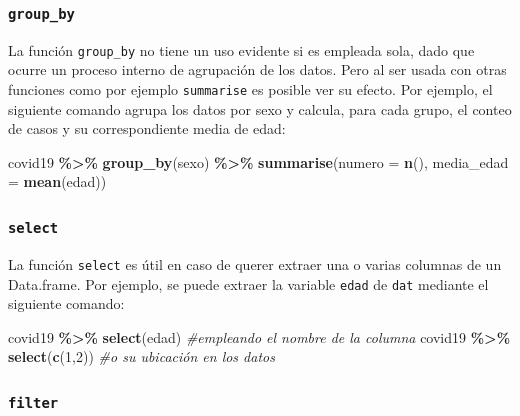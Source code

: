 \documentclass[
]{article}
\newenvironment{Shaded}{\begin{snugshade}}{\end{snugshade}}
\newcommand{\AttributeTok}[1]{\textcolor[rgb]{0.13,0.29,0.53}{#1}}
\newcommand{\CommentTok}[1]{\textcolor[rgb]{0.56,0.35,0.01}{\textit{#1}}}
\newcommand{\DecValTok}[1]{\textcolor[rgb]{0.00,0.00,0.81}{#1}}
\newcommand{\FunctionTok}[1]{\textcolor[rgb]{0.13,0.29,0.53}{\textbf{#1}}}
\newcommand{\NormalTok}[1]{#1}
\newcommand{\SpecialCharTok}[1]{\textcolor[rgb]{0.81,0.36,0.00}{\textbf{#1}}}
\begin{document}
\subsubsection{\texorpdfstring{\texttt{group\_by}}{group\_by}}\label{group_by}

La función \texttt{group\_by} no tiene un uso evidente si es empleada
sola, dado que ocurre un proceso interno de agrupación de los datos.
Pero al ser usada con otras funciones como por ejemplo
\texttt{summarise} es posible ver su efecto. Por ejemplo, el siguiente
comando agrupa los datos por sexo y calcula, para cada grupo, el conteo
de casos y su correspondiente media de edad:

\begin{Shaded}
\begin{Highlighting}[]
\NormalTok{covid19 }\SpecialCharTok{\%\textgreater{}\%} 
  \FunctionTok{group\_by}\NormalTok{(sexo) }\SpecialCharTok{\%\textgreater{}\%} 
  \FunctionTok{summarise}\NormalTok{(}\AttributeTok{numero =} \FunctionTok{n}\NormalTok{(), }\AttributeTok{media\_edad =} \FunctionTok{mean}\NormalTok{(edad))}
\end{Highlighting}
\end{Shaded}

\subsubsection{\texorpdfstring{\texttt{select}}{select}}\label{select}

La función \texttt{select} es útil en caso de querer extraer una o
varias columnas de un Data.frame. Por ejemplo, se puede extraer la
variable \texttt{edad} de \texttt{dat} mediante el siguiente comando:

\begin{Shaded}
\begin{Highlighting}[]
\NormalTok{covid19 }\SpecialCharTok{\%\textgreater{}\%} \FunctionTok{select}\NormalTok{(edad) }\CommentTok{\#empleando el nombre de la columna}
\NormalTok{covid19 }\SpecialCharTok{\%\textgreater{}\%} \FunctionTok{select}\NormalTok{(}\FunctionTok{c}\NormalTok{(}\DecValTok{1}\NormalTok{,}\DecValTok{2}\NormalTok{)) }\CommentTok{\#o su ubicación en los datos}
\end{Highlighting}
\end{Shaded}

\subsubsection{\texorpdfstring{\texttt{filter}}{filter}}\label{filter}
\end{document}
